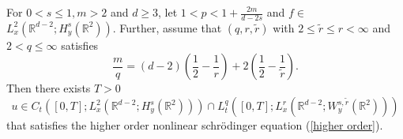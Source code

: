 \documentclass[10pt,a4paper]{amsart}
\begin{document}
	\begin{theorem}
		For   $0<s \leq 1, m>2$ and $d \geq 3$,  let   $1<p<1+\frac{2m}{ d-2s}$ and $f \in$ $L_x^2\left(\mathbb{R}^{d-2} ; H_y^s\left(\mathbb{R}^2\right)\right)$.  Further, assume that  
		$(q, r, \tilde{r})$ with $2 \leq \widetilde{r} \leq r<\infty$ and $ 2<q \leq \infty $ satisfies $$			\frac{{{m}}}{q}=(d-2)\left(\frac{1}{2}-\frac{1}{r}\right)+2\left(\frac{1}{2}-\frac{1}{\widetilde{r}}\right).$$ Then there exists  $T>0$ 
		$$
		u \in C_t\left([0, T] ; L_x^2\left(\mathbb{R}^{d-2}; H_y^s(\mathbb{R}^{2})\right)\right) \cap   L_t^q\left([0, T] ; L_x^r \left(\mathbb{R}^{d-2}; W_y^{s, \widetilde{r}}(\mathbb{R}^{2})\right)\right)
		$$
		that satisfies  the higher order nonlinear schr\"odinger equation  (\ref{higher order}).
	\end{theorem}
\end{document}

